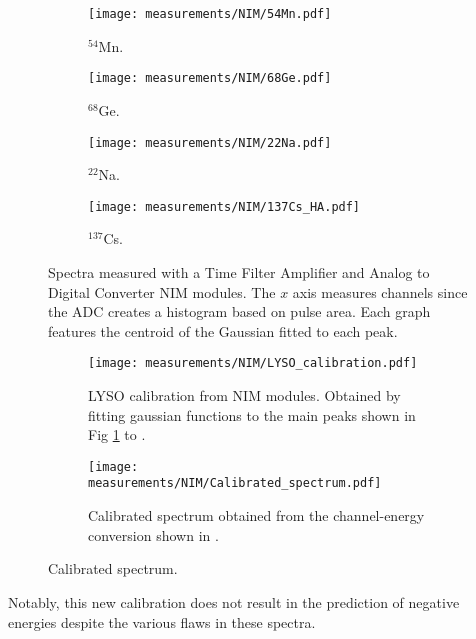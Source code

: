 \begin{figure}
  \begin{subfigure}[t]{0.47\textwidth}
    \centering
    \texttt{[image: measurements/NIM/54Mn.pdf]}
    \caption{\label{sfig:NIM_54Mn}$^{54}$Mn.}
  \end{subfigure}
  \hfill
  \begin{subfigure}[t]{0.47\textwidth}
    \centering
    \texttt{[image: measurements/NIM/68Ge.pdf]}
    \caption{\label{sfig:NIM_68Ge}$^{68}$Ge.}
  \end{subfigure}
  \medskip
  \begin{subfigure}[t]{0.47\textwidth}
    \centering
    \texttt{[image: measurements/NIM/22Na.pdf]}
    \caption{\label{sfig:NIM_22Na}$^{22}$Na.}
  \end{subfigure}
  \hfill
  \begin{subfigure}[t]{0.47\textwidth}
    \centering
    \texttt{[image: measurements/NIM/137Cs\_HA.pdf]}
    \caption{\label{sfig:NIM_137Cs}$^{137}$Cs.}
  \end{subfigure}
  \caption{\label{fig:NIM_spectra}Spectra measured with a Time Filter Amplifier and Analog to Digital Converter NIM modules. The $x$ axis measures channels since the ADC creates a histogram based on pulse area. Each graph features the centroid of the Gaussian fitted to each peak.}
\end{figure}

\begin{figure}[H]
  \begin{subfigure}[t]{\textwidth}
    \centering
    \texttt{[image: measurements/NIM/LYSO\_calibration.pdf]}
    \caption{\label{sfig:NIM_LYSO_calibration}LYSO calibration from NIM modules. Obtained by fitting gaussian functions to the main peaks shown in Fig \ref{sfig:NIM_54Mn} to .}
  \end{subfigure}
  \medskip
  \begin{subfigure}[t]{\textwidth}
    \centering
    \texttt{[image: measurements/NIM/Calibrated\_spectrum.pdf]}
    \caption{\label{sfig:NIM_LYSO_calibrated_spectrum}Calibrated spectrum obtained from the channel-energy conversion shown in .}
  \end{subfigure}
  \caption{\label{fig:NIM_calibration}Calibrated spectrum.}
\end{figure}

Notably, this new calibration does not result in the prediction of negative energies despite the various flaws in these spectra.

